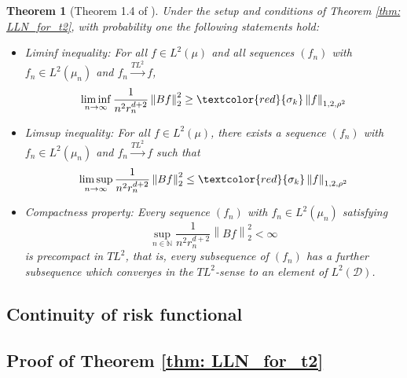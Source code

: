 \documentclass{article}
\newcommand{\norm}[1]{\left\lVert#1\right\rVert}
\newcommand{\Naturals}{\mathbb{N}}
\newcommand{\Dset}{\mathcal{D}}
\newcommand{\1}{\mathbf{1}}
\theoremstyle{alden}
\theoremstyle{aldenthm}
\newtheorem{theorem}{Theorem}
\theoremstyle{remark}
\begin{document}
\begin{theorem}[Theorem 1.4 of \cite{trillos2018}]
	Under the setup and conditions of Theorem \ref{thm: LLN_for_t2}, with probability one the following statements hold:
	\begin{itemize}
		\item \emph{Liminf inequality:}
		For all $f \in L^2(\mu)$ and all sequences $(f_n)$ with $f_n \in L^2(\mu_n)$ and $f_n \overset{TL^2}{\to} f$,
		\begin{equation*}
		\liminf_{n \to \infty} \frac{1}{n^2 r_n^{d + 2}} \norm{Bf}_2^2 \geq \textcolor{red}{\sigma_{k}} \norm{f}_{1,2,\rho^2}
		\end{equation*}
		
		\item \emph{Limsup inequality:} For all $f \in L^2(\mu)$, there exists a sequence $(f_n)$ with $f_n \in L^2(\mu_n)$ and $f_n \overset{TL^2}{\to} f$ such that
		\begin{equation*}
		\limsup_{n \to \infty} \frac{1}{n^2 r_n^{d + 2}} \norm{Bf}_2^2 \leq \textcolor{red}{\sigma_{k}} \norm{f}_{1,2,\rho^2}
		\end{equation*}
		
		\item \emph{Compactness property:} Every sequence $(f_n)$ with $f_n \in L^2(\mu_n)$ satisfying
		\begin{equation*}
		\sup_{n \in \Naturals} \frac{1}{n^2 r_n^{d + 2}} \norm{Bf}_2^2 < \infty
		\end{equation*}
		is precompact in $TL^2$, that is, every subsequence of $(f_n)$ has a further subsequence which converges in the $TL^2$-sense to an element of $L^2(\Dset)$.
	\end{itemize}
	
\end{theorem}

\subsection{Continuity of risk functional}

\subsection{Proof of Theorem \ref{thm: LLN_for_t2}}

\clearpage



\end{document}
